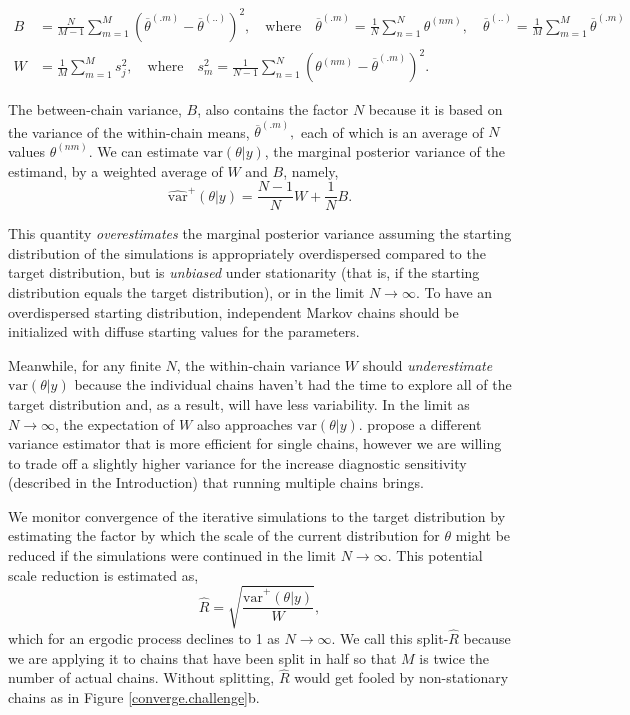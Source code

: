 \documentclass[american,]{article}
\theoremstyle{definition}
\begin{document}
\begin{align}
B &= \frac{N}{M-1}\sum_{m=1}^{M}(\overline{\theta}^{(.m)} - 
\overline{\theta}^{(..)})^2, \quad \mbox{where} \quad 
\overline{\theta}^{(.m)}=\frac{1}{N}\sum_{n=1}^N \theta^{(nm)}, \quad
\overline{\theta}^{(..)} = \frac{1}{M}\sum_{m=1}^M\overline{\theta}^{(.m)} 
\\
W &= \frac{1}{M}\sum_{m=1}^{M}s_j^2, \quad \mbox{where} \quad
s_m^2=\frac{1}{N-1} \sum_{n=1}^N (\theta^{(nm)}-\overline{\theta}^{(.m)})^2.
\end{align}

The between-chain variance, \(B\), also contains the factor \(N\)
because it is based on the variance of the within-chain means,
\(\overline{\theta}^{(.m)},\) each of which is an average of \(N\)
values \(\theta^{(nm)}\). We can estimate \(\mbox{var}(\theta | y)\),
the marginal posterior variance of the estimand, by a weighted average
of \(W\) and \(B\), namely,
\begin{equation}
\widehat{\mbox{var}}^+(\theta| y) = \frac{N-1}{N}W + \frac{1}{N}B.
\end{equation}

This quantity \emph{overestimates} the marginal posterior variance
assuming the starting distribution of the simulations is appropriately
overdispersed compared to the target distribution, but is
\emph{unbiased} under stationarity (that is, if the starting
distribution equals the target distribution), or in the limit
\(N\rightarrow\infty\). To have an overdispersed starting distribution,
independent Markov chains should be initialized with diffuse starting
values for the parameters. 

Meanwhile, for any finite \(N\), the within-chain variance \(W\) should
\emph{underestimate} \(\mbox{var}(\theta |y)\) because the
individual chains haven't had the time to explore all of the target
distribution and, as a result, will have less variability. In the limit
as \(N\rightarrow\infty\), the expectation of \(W\) also approaches
\(\mbox{var}(\theta |y)\). \citet{vats2018revisiting} propose a different variance estimator that is more efficient for single chains, however we are willing to trade off a slightly higher variance for the increase diagnostic sensitivity (described in the Introduction) that running multiple chains brings.

We monitor convergence of the iterative simulations to the target
distribution by estimating the factor by which the scale of the current
distribution for \(\theta\) might be reduced if the simulations were
continued in the limit \(N\rightarrow\infty\). This potential scale
reduction is estimated as,
\begin{equation}
\widehat{R} = \sqrt{\frac{\widehat{\mbox{var}}^+(\theta | y)}{W}},
\end{equation}
which for an ergodic process declines to 1 as \(N\rightarrow\infty\). We call this
split-\(\widehat{R}\) because we are applying it to chains that
have been split in half so that \(M\) is twice the number of actual
chains. Without splitting, \(\widehat{R}\) would get fooled by
non-stationary chains as in Figure \ref{converge.challenge}b.
\end{document}
